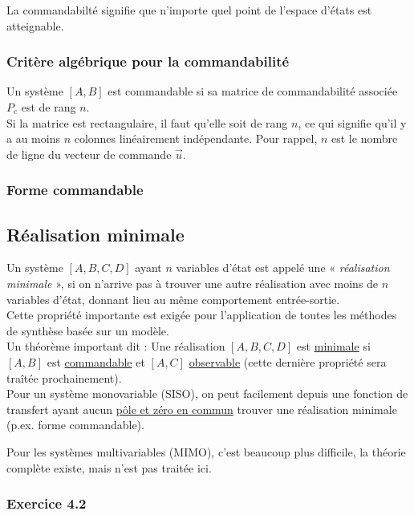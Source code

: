 \documentclass[document.tex]{subfiles}
\begin{document}
La commandabilté  signifie que n'importe quel point de l'espace d'états est atteignable.

\subsubsection{Critère algébrique pour la commandabilité}


Un système $[A,B]$ est commandable si sa matrice de commandabilité associée
$P_c$ est de rang $n$.\\
Si la matrice est rectangulaire, il faut qu'elle soit de rang $n$, ce qui signifie qu'il y a au moins $n$ colonnes linéairement indépendante. Pour rappel, $n$ est le nombre de ligne du vecteur de commande $\vec{u}$.

\subsubsection{Forme commandable}


\subsection{Réalisation minimale}

Un système $[A, B, C, D]$ ayant $n$ variables d'état est appelé une « \textit{réalisation minimale }», si on n'arrive pas à trouver une autre réalisation avec moins de $n$ variables d'état, donnant lieu au même comportement entrée-sortie. \\

Cette propriété importante est exigée pour l’application de toutes les méthodes de synthèse basée sur un modèle. \\

Un théorème important dit : Une réalisation $[A, B, C, D]$ est \underline{minimale} si $[A, B]$ est \underline{commandable} et $[A, C]$ \underline{observable} (cette dernière propriété sera traîtée prochainement). \\

Pour un système monovariable (SISO), on peut facilement depuis une fonction de transfert ayant aucun \underline{pôle et zéro en commun} trouver une réalisation minimale (p.ex. forme commandable).

Pour les systèmes multivariables (MIMO), c'est beaucoup plus difficile, la théorie complète existe, mais n'est pas traitée ici.

\subsubsection{Exercice 4.2}
\end{document}

